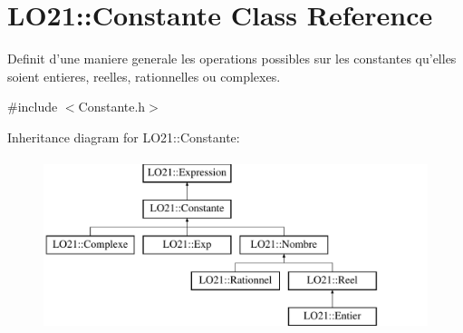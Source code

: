 \hypertarget{class_l_o21_1_1_constante}{\section{\-L\-O21\-:\-:\-Constante \-Class \-Reference}
\label{class_l_o21_1_1_constante}
}


\-Definit d'une maniere generale les operations possibles sur les constantes qu'elles soient entieres, reelles, rationnelles ou complexes.  




{\ttfamily \#include $<$\-Constante.\-h$>$}

\-Inheritance diagram for \-L\-O21\-:\-:\-Constante\-:\begin{figure}[H]
\begin{center}
\leavevmode
\includegraphics[height=5.000000cm]{class_l_o21_1_1_constante}
\end{center}
\end{figure}
